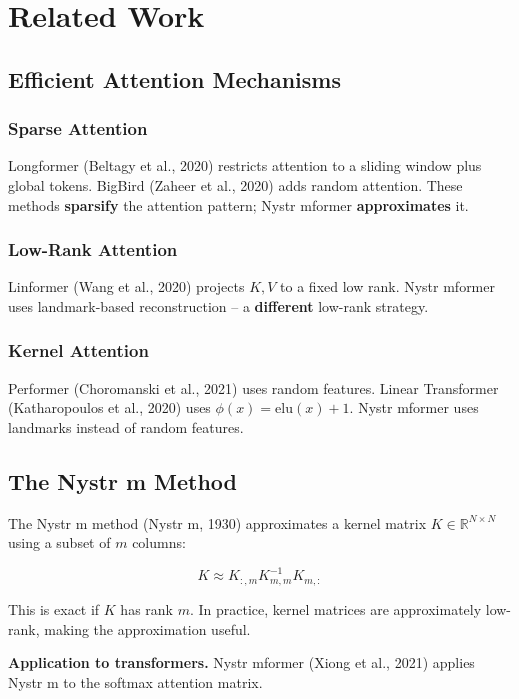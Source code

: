 
\section{Related Work}

\subsection{Efficient Attention Mechanisms}

\subsubsection{Sparse Attention}

Longformer (Beltagy et al., 2020) restricts attention to a sliding window 
plus global tokens. BigBird (Zaheer et al., 2020) adds random attention. 
These methods \textbf{sparsify} the attention pattern; Nystr mformer 
\textbf{approximates} it.

\subsubsection{Low-Rank Attention}

Linformer (Wang et al., 2020) projects $K, V$ to a fixed low rank. Nystr mformer 
uses landmark-based reconstruction -- a \textbf{different} low-rank strategy.

\subsubsection{Kernel Attention}

Performer (Choromanski et al., 2021) uses random features. Linear Transformer 
(Katharopoulos et al., 2020) uses $\phi(x) = \mathrm{elu}(x) + 1$. Nystr mformer 
uses landmarks instead of random features.

\subsection{The Nystr m Method}

The Nystr m method (Nystr m, 1930) approximates a kernel matrix $K \in \mathbb{R}^{N \times N}$ 
using a subset of $m$ columns:

\[
K \approx K_{:, m} K_{m, m}^{-1} K_{m, :}
\tag{2.1}
\]

This is exact if $K$ has rank $m$. In practice, kernel matrices are 
approximately low-rank, making the approximation useful.

\textbf{Application to transformers.} Nystr mformer (Xiong et al., 2021) applies 
Nystr m to the softmax attention matrix.

